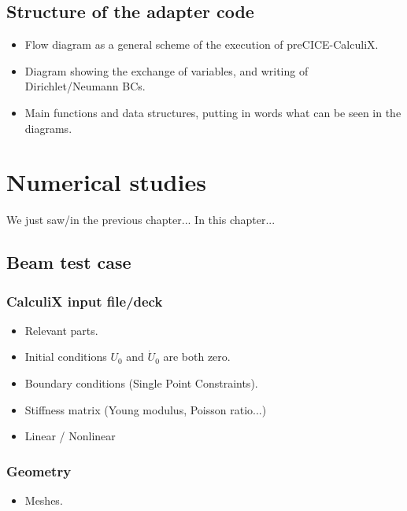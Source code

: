 \documentclass[a4paper, 11pt, oneside]{Thesis}  %
\begin{document}
    \section{Structure of the adapter code}
    
        \begin{itemize}
            \item Flow diagram as a general scheme of the execution of preCICE-CalculiX.
            \item Diagram showing the exchange of variables, and writing of Dirichlet/Neumann BCs.
            \item Main functions and data structures, putting in words what can be seen in the diagrams.
        \end{itemize}
    

\chapter{Numerical studies}

    We just saw/in the previous chapter...
    In this chapter...

    \section{Beam test case}
            
        \subsection{CalculiX input file/deck}
        
            \begin{itemize}
                \item Relevant parts.
                \item Initial conditions $U_{0}$ and $\dot{U}_{0}$ are both zero.
                \item Boundary conditions (Single Point Constraints).
                \item Stiffness matrix (Young modulus, Poisson ratio...)
                \item Linear / Nonlinear
            \end{itemize}
        
        \subsection{Geometry}
        
            \begin{itemize}
                \item Meshes.
            \end{itemize}
        
\end{document}
